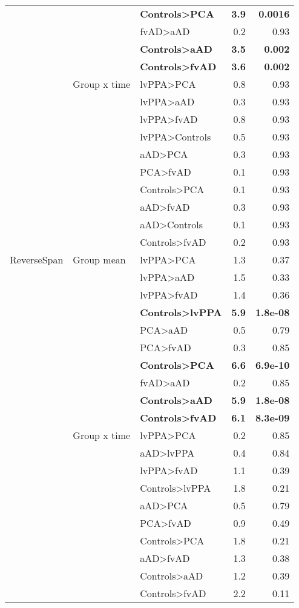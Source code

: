 \documentclass[]{article}
\begin{document}
\begin{table}[ht]
{\begin{tabular}{lllrr}
   &  & \textbf{Controls>PCA} & \textbf{3.9} & \textbf{0.0016} \\ 
   &  & fvAD>aAD & 0.2 & 0.93 \\ 
   &  & \textbf{Controls>aAD} & \textbf{3.5} & \textbf{0.002} \\ 
   &  & \textbf{Controls>fvAD} & \textbf{3.6} & \textbf{0.002} \\ 
   & Group x time & lvPPA>PCA & 0.8 & 0.93 \\ 
   &  & lvPPA>aAD & 0.3 & 0.93 \\ 
   &  & lvPPA>fvAD & 0.8 & 0.93 \\ 
   &  & lvPPA>Controls & 0.5 & 0.93 \\ 
   &  & aAD>PCA & 0.3 & 0.93 \\ 
   &  & PCA>fvAD & 0.1 & 0.93 \\ 
   &  & Controls>PCA & 0.1 & 0.93 \\ 
   &  & aAD>fvAD & 0.3 & 0.93 \\ 
   &  & aAD>Controls & 0.1 & 0.93 \\ 
   &  & Controls>fvAD & 0.2 & 0.93 \\ 
  ReverseSpan & Group mean & lvPPA>PCA & 1.3 & 0.37 \\ 
   &  & lvPPA>aAD & 1.5 & 0.33 \\ 
   &  & lvPPA>fvAD & 1.4 & 0.36 \\ 
   &  & \textbf{Controls>lvPPA} & \textbf{5.9} & \textbf{1.8e-08} \\ 
   &  & PCA>aAD & 0.5 & 0.79 \\ 
   &  & PCA>fvAD & 0.3 & 0.85 \\ 
   &  & \textbf{Controls>PCA} & \textbf{6.6} & \textbf{6.9e-10} \\ 
   &  & fvAD>aAD & 0.2 & 0.85 \\ 
   &  & \textbf{Controls>aAD} & \textbf{5.9} & \textbf{1.8e-08} \\ 
   &  & \textbf{Controls>fvAD} & \textbf{6.1} & \textbf{8.3e-09} \\ 
   & Group x time & lvPPA>PCA & 0.2 & 0.85 \\ 
   &  & aAD>lvPPA & 0.4 & 0.84 \\ 
   &  & lvPPA>fvAD & 1.1 & 0.39 \\ 
   &  & Controls>lvPPA & 1.8 & 0.21 \\ 
   &  & aAD>PCA & 0.5 & 0.79 \\ 
   &  & PCA>fvAD & 0.9 & 0.49 \\ 
   &  & Controls>PCA & 1.8 & 0.21 \\ 
   &  & aAD>fvAD & 1.3 & 0.38 \\ 
   &  & Controls>aAD & 1.2 & 0.39 \\ 
   &  & Controls>fvAD & 2.2 & 0.11 \\ 
   \hline
\end{tabular}
}
\end{table}
\end{document}
